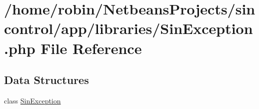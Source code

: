 \hypertarget{_sin_exception_8php}{}\section{/home/robin/\+Netbeans\+Projects/sincontrol/app/libraries/\+Sin\+Exception.php File Reference}
\label{_sin_exception_8php}
\subsection*{Data Structures}
\begin{DoxyCompactItemize}
\item 
class \hyperlink{class_sin_exception}{Sin\+Exception}
\end{DoxyCompactItemize}
